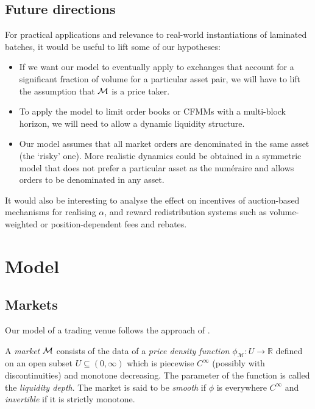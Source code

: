 \subsection{Future directions}
%
For practical applications and relevance to real-world instantiations of laminated batches, it would be useful to lift some of our hypotheses:
\begin{itemize}
  \item
    If we want our model to eventually apply to exchanges that account for a significant fraction of volume for a particular asset pair, we will have to lift the assumption that $\mathcal{M}$ is a price taker. 
  \item
    To apply the model to limit order books or CFMMs with a multi-block horizon, we will need to allow a dynamic liquidity structure.    
  \item
    Our model assumes that all market orders are denominated in the same asset (the `risky' one).
    More realistic dynamics could be obtained in a symmetric model that does not prefer a particular asset as the num\'eraire and allows orders to be denominated in any asset.
\end{itemize}
%
It would also be interesting to analyse the effect on incentives of auction-based mechanisms for realising $\alpha$, and reward redistribution systems such as volume-weighted or position-dependent fees and rebates.

\section{Model}
\subsection{Markets} \label{markets}

Our model of a trading venue follows the approach of \cite{milionis2023complexity}.

\begin{definition} \label{market}
  A \emph{market} \(\mathcal{M}\) consists of the data of a \emph{price density function} \(\phi_\mathcal{M}:U\rightarrow\mathbb{R}\) defined on an open subset \(U\subseteq(0,\infty)\) which is piecewise \(C^\infty\) (possibly with discontinuities) and monotone decreasing. The parameter of the function is called the \emph{liquidity depth}. The market is said to be \emph{smooth} if \(\phi\) is everywhere \(C^\infty\) and \emph{invertible} if it is strictly monotone. 
\end{definition}


